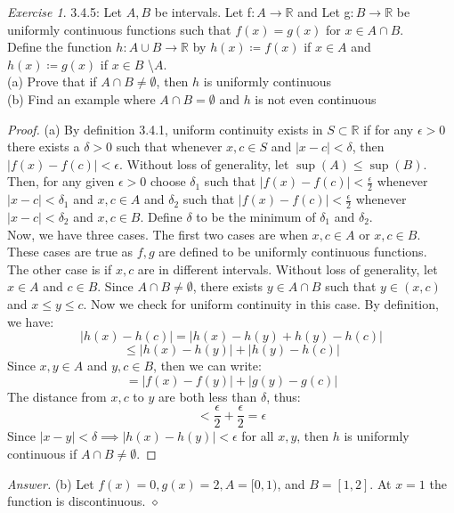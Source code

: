 \documentclass[12pt,oneside]{amsart}
\theoremstyle{definition}
\theoremstyle{remark}
\newtheorem{exer}{Exercise}
\numberwithin{equation}{exer}
\newenvironment{answer}{\bigskip\noindent\emph{Answer.}}{\hfill$\diamond$\newline}
\begin{document}
\newpage
\begin{exer}
3.4.5: Let $A,B$ be intervals. Let f$:A\rightarrow\mathbb{R}$ and Let g$:B\rightarrow \mathbb{R}$ be uniformly continuous functions such that $f(x)=g(x)$ for $x\in A\cap B$.\\ Define the function $h:A\cup B\rightarrow\mathbb{R}$ by $h(x) \coloneqq f(x)$ if $x \in A$ and $h(x) \coloneqq g(x)$ if $x\in B$ \textbackslash $A$. \\
(a) Prove that if $A \cap B \neq \emptyset$, then $h$ is uniformly continuous \\
(b) Find an example where $A \cap B = \emptyset$ and $h$ is not even continuous
\end{exer}
\begin{proof}
(a) By definition 3.4.1, uniform continuity exists in $S \subset \mathbb{R}$ if for any $\epsilon > 0$ there exists a $\delta > 0$ such that whenever $x,c \in S$ and $|x-c|<\delta$, then $|f(x)-f(c)|<\epsilon$. Without loss of generality, let $\sup(A)\leq \sup(B)$. Then, for any given $\epsilon >0$ choose $\delta_1$ such that $|f(x)-f(c)|< \frac{\epsilon}{2}$ whenever $|x-c|<\delta_1$ and $x,c \in A$ and $\delta_2$ such that $|f(x)-f(c)|<\frac{\epsilon}{2}$  whenever $|x-c|<\delta_2$ and $x,c \in B$. Define $\delta$ to be the minimum of $\delta_1$ and $\delta_2$. \\
Now, we have three cases. The first two cases are when $x,c \in A$ or $x,c \in B$. These cases are true as $f,g$ are defined to be uniformly continuous functions. \\
The other case is if $x,c$ are in different intervals. Without loss of generality, let $x \in A$ and $c \in B$. Since $A \cap B \neq \emptyset$, there exists $y \in A \cap B$ such that $y \in (x,c)$ and $x \leq y \leq c$. Now we check for uniform continuity in this case. By definition, we have: 
$$|h(x)-h(c)|=|h(x)-h(y)+h(y)-h(c)|$$
$$\leq |h(x)-h(y)|+|h(y)-h(c)|$$
Since $x,y \in A$ and $y,c \in B$, then we can write:
$$= |f(x)-f(y)|+|g(y)-g(c)|$$
The distance from $x,c$ to $y$ are both less than $\delta$, thus:
$$< \frac{\epsilon}{2}+\frac{\epsilon}{2}=\epsilon$$
Since $|x-y|<\delta \implies |h(x)-h(y)|<\epsilon$ for all $x,y$, then $h$ is uniformly continuous if $A \cap B \neq \emptyset$.
\end{proof}
\begin{answer}
(b) Let $f(x)=0, g(x)=2, A=[0,1)$, and $B=[1,2]$. At $x=1$ the function is discontinuous.
\end{answer}
\end{document}
